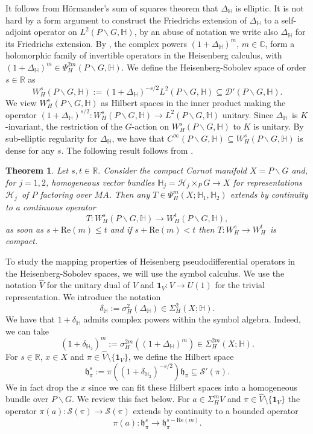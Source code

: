 \documentclass[a4paper,reqno]{amsart}
\numberwithin{equation}{section}
\def\C{\mathbb{C}}
\def\R{\mathbb{R}}
\newtheorem{thm}{Theorem}[section]
\theoremstyle{definition}
\theoremstyle{remark}
\begin{document}
It follows from Hörmander's sum of squares theorem that $\Delta_{\mathbb{H}}$ is elliptic. It is not hard by a form argument to construct the Friedrichs extension of $\Delta_{\mathbb{H}}$ to a self-adjoint operator on $L^2(P\backslash G,\mathbb{H})$, by an abuse of notation we write also $\Delta_{\mathbb{H}}$ for its Friedrichs extension. By \cite{Dave_Haller2}, the complex powers $(1+\Delta_{\mathbb{H}})^m$, $m\in \C$, form a holomorphic family of invertible operators in the Heisenberg calculus, with $(1+\Delta_{\mathbb{H}})^m\in \Psi^{2m}_H(P\backslash G,\mathbb{H})$. We define the Heisenberg-Sobolev space of order $s\in \R$ as 
$$W^s_H(P\backslash G,\mathbb{H}):=(1+\Delta_{\mathbb{H}})^{-s/2}L^2(P\backslash G,\mathbb{H})\subseteq \mathcal{D}'(P\backslash G,\mathbb{H}).$$
We view $W^s_H(P\backslash G,\mathbb{H})$ as Hilbert spaces in the inner product making the operator $(1+\Delta_{\mathbb{H}})^{s/2}:W^s_H(P\backslash G,\mathbb{H})\to L^2(P\backslash G,\mathbb{H})$ unitary. Since $\Delta_{\mathbb{H}}$ is $K$-invariant, the restriction of the $G$-action on $W^s_H(P\backslash G,\mathbb{H})$ to $K$ is unitary. By sub-elliptic regularity for $\Delta_{\mathbb{H}}$, we have that $C^\infty(P\backslash G,\mathbb{H})\subseteq W^s_H(P\backslash G,\mathbb{H})$ is dense for any $s$. The following result follows from \cite[Proposition 3.9]{Dave_Haller1}. 


\begin{thm}
\label{bddsds}
Let $s,t\in \R$. Consider the compact Carnot manifold $X=P\backslash G$ and, for $j=1,2$, homogeneous vector bundles $\mathbb{H}_j=\mathcal{H}_j\times_P G\to X$ for representations $\mathcal{H}_j$ of $P$ factoring over $MA$. Then any $T\in \Psi_H^m(X;\mathbb{H}_1,\mathbb{H}_2)$ extends by continuity to a continuous operator
$$T:W^s_H(P\backslash G,\mathbb{H})\to W^t_H(P\backslash G,\mathbb{H}),$$
as soon as $s+\mathrm{Re}(m)\leq t$ and if $s+\mathrm{Re}(m)< t$ then $T:W^s_H\to W^t_H$ is compact. 
\end{thm}


To study the mapping properties of Heisenberg pseudodifferential operators in the Heisenberg-Sobolev spaces, we will use the symbol calculus. We use the notation $\hat{V}$ for the unitary dual of $V$ and $\pmb{1}_V:V\to U(1)$ for the trivial representation. We introduce the notation 
$$\delta_{\mathbb{H}}:=\sigma_H^2(\Delta_\mathbb{H})\in \Sigma_H^2(X;\mathbb{H}).$$
We have that $1+\delta_{\mathbb{H}}$ admits complex powers within the symbol algebra. Indeed, we can take 
$$(1+\delta_{\mathbb{H}_2})^m:=\sigma_H^{2m}((1+\Delta_\mathbb{H})^m)\in \Sigma_H^{2m}(X;\mathbb{H}).$$
For $s\in \R$, $x\in X$ and $\pi\in \hat{V}\setminus \{\pmb{1}_V\}$, we define the Hilbert space 
$$\mathfrak{h}^s_\pi :=\pi((1+\delta_{\mathbb{H}_2})^{-s/2})\mathfrak{h}_\pi\subseteq \mathcal{S}'(\pi).$$
We in fact drop the $x$ since we can fit these Hilbert spaces into a homogeneous bundle over $P\backslash G$. We review this fact below. For $a\in \Sigma^m_HV$ and $\pi\in \hat{V}\setminus \{\pmb{1}_V\}$ the operator $\pi(a):\mathcal{S}(\pi)\to \mathcal{S}(\pi)$ extends by continuity to a bounded operator 
$$\pi(a):\mathfrak{h}^s_\pi \to \mathfrak{h}^{s-\mathrm{Re}(m)}_\pi.$$
\end{document}
